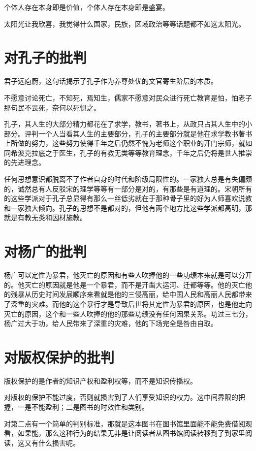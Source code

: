 \documentclass[12pt,oneside]{book}
\begin{document}
个体人存在本身即是价值，个体人存在本身即是盛宴。

太阳光让我欣喜，我觉得什么国家，民族，区域政治等等话题都不如这太阳光。

\chapter{对孔子的批判}
君子远庖厨，这句话揭示了孔子作为养尊处优的文官寄生阶层的本质。

不愿意讨论死亡，不知死，焉知生，儒家不愿意对民众进行死亡教育是怕，怕老子那句民不畏死，奈何以死惧之。

孔子，其人生的大部分精力都花在了求学，教书，著书上，从政只占其人生中的小部分。评判一个人当看其人生的主要部分，孔子的主要部分就是他在求学教书著书上所做的努力，这些努力使得千年之后仍然不愧为老师这个职业的开门宗师，就如同希波克拉底之于医生，孔子的有教无类等等教育理念，千年之后仍将是世人推崇的先进理念。

任何思想意识都脱离不了作者自身的时代和阶级局限性的。一家独大总是有失偏颇的，诚然总有人反驳宋的理学等等有一部分是对的，有那些是有道理的。宋朝所有的这些学派对于孔子总显得有那么一丝低劣就在于那种骨子里的好为人师喜欢说教和一家独大倾向。孔子的思想不是都对的，但他有两个地方比这些学派都高明，那就是有教无类和因材施教。​

\chapter{对杨广的批判}
杨广可以定性为暴君，他灭亡的原因和有些人吹捧他的一些功绩本来就是可以分开的。他灭亡的原因就是他是一个暴君，而不是开凿大运河、迁都等等。他的灭亡他的残暴从历史时间发展顺序来看就是他的三侵高丽，给中国人民和高丽人民都带来了深重的灾难。而他的这个暴行才是导致后世将其定性为暴君的原因，也是他走向灭亡的原因，这个和一些人吹捧的他的那些功绩没有任何因果关系。功过三七分，杨广过大于功，给人民带来了深重的灾难，他的下场完全是咎由自取。

\chapter{对版权保护的批判}
版权保护的是作者的知识产权和盈利权等，而不是知识传播权。

对版权的保护不能过度，否则就损害到了人们享受知识的权力。这中间界限的把握，一是不能盈利；二是图书的时效性和类别。

对第二点有一个简单的判别标准，那就是这本图书在图书馆里面能不能免费借阅观看，如果能，那么这种行为的结果无非是让阅读者从图书馆阅读转移到了到家里阅读，这又有什么损害呢。
\end{document}
